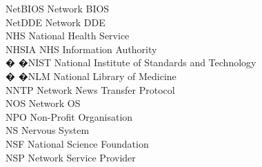 \begin{tabbing}

    \>NetBIOS \>\>Network BIOS\\

    \>NetDDE \>\>Network DDE\\




    \>NHS \>\>National Health Service\\

    \>NHSIA \>\>NHS Information Authority\\




 � �\>NIST \>\>National Institute of Standards and Technology\\

 � �\>NLM \>\>National Library of Medicine\\

    \>NNTP \>\>Network News Transfer Protocol\\

    \>NOS \>\>Network OS\\

    \>NPO \>\>Non-Profit Organisation\\

    \>NS \>\>Nervous System\\


    \>NSF \>\>National Science Foundation\\

    \>NSP \>\>Network Service Provider\\




\end{tabbing}
